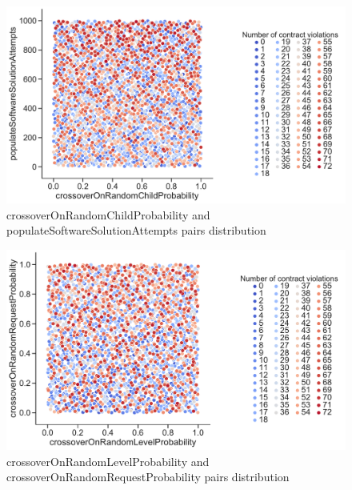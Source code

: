 \begin{figure}
	\centering
	\includegraphics[width=\textwidth]{images/PairsDistr/crossoverOnRandomChildProbability_populateSoftwareSolutionAttempts.pdf}
	\caption[crossoverOnRandomChildProbability and populateSoftwareSolutionAttempts pairs distribution]{crossoverOnRandomChildProbability and populateSoftwareSolutionAttempts pairs distribution}
	\label{fig:crossoverOnRandomChildProbability_populateSoftwareSolutionAttempts_pair}
\end{figure}
\clearpage
\begin{figure}
	\centering
	\includegraphics[width=\textwidth]{images/PairsDistr/crossoverOnRandomLevelProbability_crossoverOnRandomRequestProbability.pdf}
	\caption[crossoverOnRandomLevelProbability and crossoverOnRandomRequestProbability pairs distribution]{crossoverOnRandomLevelProbability and crossoverOnRandomRequestProbability pairs distribution}
	\label{fig:crossoverOnRandomLevelProbability_crossoverOnRandomRequestProbability_pair}
\end{figure}
\clearpage
